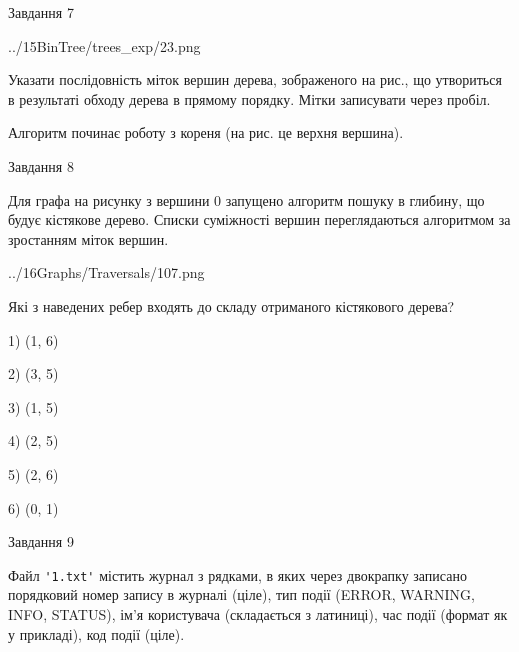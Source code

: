 \documentclass[12pt, ukrainian]{article}
\def\code#1{\Verb!#1!}
\begin{document}
{\vspace{10mm}\par

\newpage
\begin{minipage}[t]{9.7cm}
               
{\begin{center}Завдання {7}\end{center}}
\vspace{-4mm}

\begin{center}
	{../15BinTree/trees_exp/23.png}
\end{center}
Указати послідовність міток вершин дерева, зображеного на рис., що утвориться в результаті обходу дерева в прямому порядку. Мітки записувати через пробіл.\par Алгоритм починає роботу з кореня (на рис. це верхня вершина).\par

\end{minipage}
\vline \hspace{8mm}
\begin{minipage}[t]{8.0cm}
               
{\begin{center}Завдання {8}\end{center}}
\vspace{-4mm}
Для графа на рисунку з вершини 0 запущено алгоритм пошуку в глибину, що будує кістякове дерево. Списки суміжності вершин переглядаються алгоритмом за зростанням міток вершин.\par
\begin{center}
	{../16Graphs/Traversals/107.png}
\end{center}
\par Які з наведених ребер входять до складу отриманого кістякового дерева?\par
1) (1, 6)\par
2) (3, 5)\par
3) (1, 5)\par
4) (2, 5)\par
5) (2, 6)\par
6) (0, 1)\par
{\vskip 15pt} \par

\end{minipage}

               
{\begin{center}Завдання {9}\end{center}}
\vspace{-4mm}
Файл \code{'1.txt'} містить журнал з рядками, в яких через двокрапку записано поряд\-ко\-вий номер запису в журналі (ціле), тип події (ERROR, WARNING, INFO, STATUS), ім'я користувача (складається з латиниці), час події (фор\-мат як у прикладі), код події (ціле).

}
\end{document}
